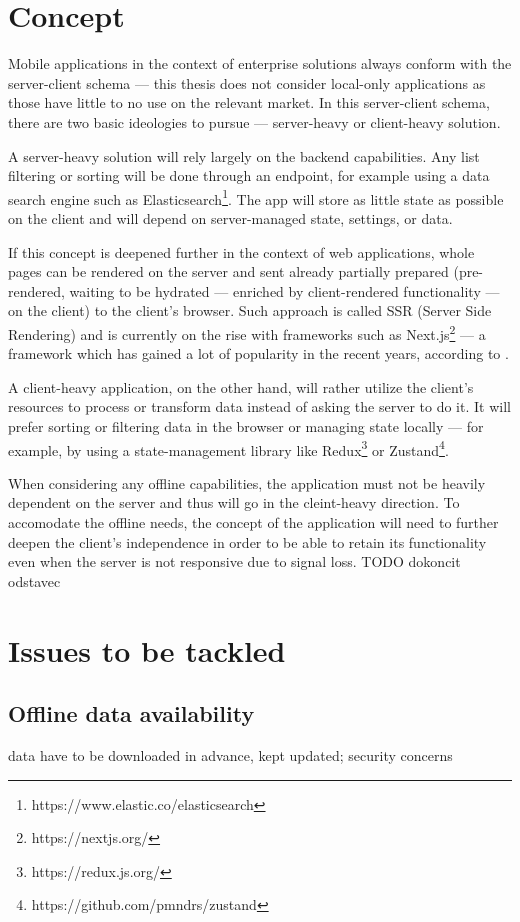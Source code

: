 \documentclass[
  digital,     %
  color,       %
  oneside,     %
  nosansbold,  %
  nocolorbold, %
  lof,         %
  lot,         %
]{fithesis4}
\begin{document}
\section{Concept}
Mobile applications in the context of enterprise solutions always conform with the server-client schema --- this thesis does not consider local-only applications as those have little to no use on the relevant market. In this server-client schema, there are two basic ideologies to pursue --- server-heavy or client-heavy solution. 

A server-heavy solution will rely largely on the backend capabilities. Any list filtering or sorting will be done through an endpoint, for example using a data search engine such as Elasticsearch\footnote{https://www.elastic.co/elasticsearch}. The app will store as little state as possible on the client and will depend on server-managed state, settings, or data. 

If this concept is deepened further in the context of web applications, whole pages can be rendered on the server and sent already partially prepared (pre-rendered, waiting to be hydrated --- enriched by client-rendered functionality --- on the client) to the client's browser. Such approach is called SSR (Server Side Rendering) and is currently on the rise with frameworks such as Next.js\footnote{https://nextjs.org/} --- a framework which has gained a lot of popularity in the recent years, according to .

A client-heavy application, on the other hand, will rather utilize the client's resources to process or transform data instead of asking the server to do it. It will prefer sorting or filtering data in the browser or managing state locally --- for example, by using a state-management library like Redux\footnote{https://redux.js.org/} or Zustand\footnote{https://github.com/pmndrs/zustand}.

When considering any offline capabilities, the application must not be heavily dependent on the server and thus will go in the cleint-heavy direction. To accomodate the offline needs, the concept of the application will need to further deepen the client's independence in order to be able to retain its functionality even when the server is not responsive due to signal loss. TODO dokoncit odstavec
\section{Issues to be tackled}
\subsection{Offline data availability}
data have to be downloaded in advance, kept updated; security concerns
\end{document}
